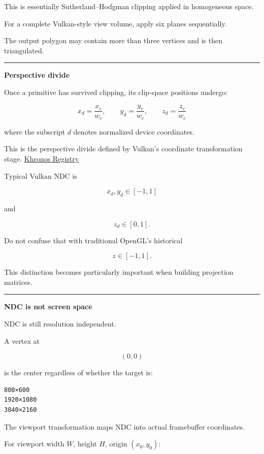 This is essentially Sutherland--Hodgman clipping applied in homogeneous space.

For a complete Vulkan-style view volume, apply six planes sequentially.

The output polygon may contain more than three vertices and is then triangulated.

\begin{center}\rule{0.5\linewidth}{0.5pt}\end{center}

\textbf{Perspective divide}

Once a primitive has survived clipping, its clip-space positions undergo:

\[
\boxed{
x_d=\frac{x_c}{w_c},\qquad
y_d=\frac{y_c}{w_c},\qquad
z_d=\frac{z_c}{w_c}
}
\]

where the subscript \(d\) denotes normalized device coordinates.

This is the perspective divide defined by Vulkan's coordinate transformation stage. \href{https://registry.khronos.org/vulkan/specs/latest-ratified/pdf/vkspec.pdf?utm_source=chatgpt.com}{Khronos Registry}

Typical Vulkan NDC is

\[
x_d,y_d\in[-1,1]
\]

and

\[
z_d\in[0,1].
\]

Do not confuse that with traditional OpenGL's historical

\[
z\in[-1,1].
\]

This distinction becomes particularly important when building projection matrices.

\begin{center}\rule{0.5\linewidth}{0.5pt}\end{center}

\textbf{NDC is not screen space}

NDC is still resolution independent.

A vertex at

\[
(0,0)
\]

is the center regardless of whether the target is:

\begin{verbatim}
800×600
1920×1080
3840×2160
\end{verbatim}

The viewport transformation maps NDC into actual framebuffer coordinates.

For viewport width \(W\), height \(H\), origin \((x_0,y_0)\):


